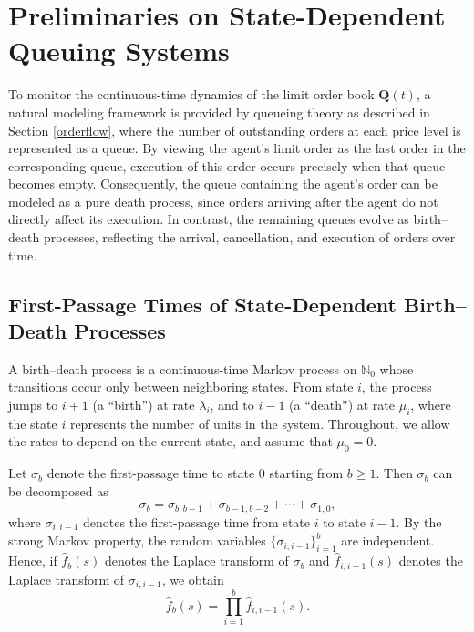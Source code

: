 \documentclass[11pt]{article}
\begin{document}
\section{Preliminaries on State-Dependent Queuing Systems}\label{chapter: mathematicaltools}

To monitor the continuous-time dynamics of the limit order book $\boldsymbol{Q}(t)$, a natural modeling framework is provided by queueing theory as described in Section \ref{orderflow}, where the number of outstanding orders at each price level is represented as a queue. By viewing the agent’s limit order as the last order in the corresponding queue, execution of this order occurs precisely when that queue becomes empty. Consequently, the queue containing the agent’s order can be modeled as a pure death process, since orders arriving after the agent do not directly affect its execution. In contrast, the remaining queues evolve as birth--death processes, reflecting the arrival, cancellation, and execution of orders over time.

\subsection{First-Passage Times of State-Dependent Birth--Death Processes}\label{SectionFPT}

A birth--death process is a continuous-time Markov process on $\mathbb{N}_0$ whose transitions occur only between neighboring states. From state $i$, the process jumps to $i+1$ (a ``birth'') at rate $\lambda_i$, and to $i-1$ (a ``death'') at rate $\mu_i$, where the state $i$ represents the number of units in the system. Throughout, we allow the rates to depend on the current state, and assume that $\mu_0=0$.

Let $\sigma_b$ denote the first-passage time to state $0$ starting from $b\geq 1$. Then $\sigma_b$ can be decomposed as
\begin{equation}\label{fpt_sum}
\sigma_b
=
\sigma_{b,b-1}+\sigma_{b-1,b-2}+\cdots+\sigma_{1,0},
\end{equation}
where $\sigma_{i,i-1}$ denotes the first-passage time from state $i$ to state $i-1$. By the strong Markov property, the random variables $\{\sigma_{i,i-1}\}_{i=1}^b$ are independent. Hence, if $\hat{f}_b(s)$ denotes the Laplace transform of $\sigma_b$ and $\hat{f}_{i,i-1}(s)$ denotes the Laplace transform of $\sigma_{i,i-1}$, we obtain
\begin{equation}\label{LTproduct}
\hat{f}_b(s)
=
\prod_{i=1}^b \hat{f}_{i,i-1}(s).
\end{equation}
\end{document}
